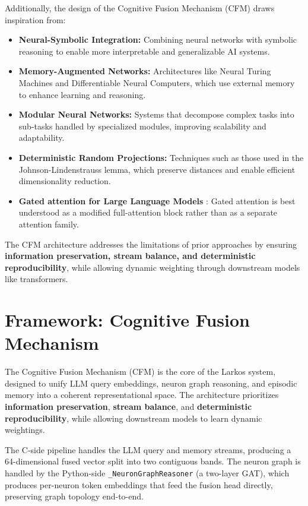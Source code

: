 \documentclass[12pt]{article}
\begin{document}
Additionally, the design of the Cognitive Fusion Mechanism (CFM)
draws inspiration from:
\begin{itemize}
    \item \textbf{Neural-Symbolic Integration:} Combining neural
    networks with symbolic reasoning to enable more interpretable and
    generalizable AI systems.
    \item \textbf{Memory-Augmented Networks:} Architectures like
    Neural Turing Machines and Differentiable Neural Computers, which
    use external memory to enhance learning and reasoning.
    \item \textbf{Modular Neural Networks:} Systems that decompose
    complex tasks into sub-tasks handled by specialized modules,
    improving scalability and adaptability.
    \item \textbf{Deterministic Random Projections:} Techniques such
    as those used in the Johnson-Lindenstrauss lemma, which preserve
    distances and enable efficient dimensionality reduction.
\item \textbf{Gated attention for Large Language Models }: Gated attention is best understood as a modified full-attention block rather than as a separate attention family.
\end{itemize}

The CFM architecture addresses the limitations of prior approaches by
ensuring \textbf{information preservation, stream balance, and
deterministic reproducibility}, while allowing dynamic weighting
through downstream models like transformers.

\section{Framework: Cognitive Fusion Mechanism}
\label{sec:framework}

The Cognitive Fusion Mechanism (CFM) is the core of the Larkos
system, designed to unify LLM query embeddings, neuron graph reasoning,
and episodic memory into a coherent representational space. The
architecture prioritizes \textbf{information preservation},
\textbf{stream balance}, and \textbf{deterministic reproducibility},
while allowing downstream models to learn dynamic weightings.

The C-side pipeline handles the LLM query and memory streams,
producing a 64-dimensional fused vector split into two contiguous bands.
The neuron graph is handled by the Python-side \texttt{\_NeuronGraphReasoner}
(a two-layer GAT), which produces per-neuron token embeddings that feed
the fusion head directly, preserving graph topology end-to-end.
\end{document}
